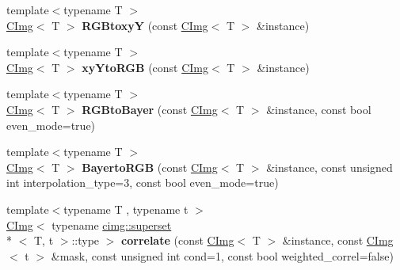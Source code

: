 \begin{DoxyCompactItemize}
\item 
\hypertarget{namespacecimg__library_a41902389cf0f939928cf8006540f9521}{{\footnotesize template$<$typename T $>$ }\\\hyperlink{structcimg__library_1_1_c_img}{C\-Img}$<$ T $>$ {\bfseries R\-G\-Btoxy\-Y} (const \hyperlink{structcimg__library_1_1_c_img}{C\-Img}$<$ T $>$ \&instance)}\label{namespacecimg__library_a41902389cf0f939928cf8006540f9521}

\item 
\hypertarget{namespacecimg__library_af124c838a51f3b7dbaf4dbe0506ac6bf}{{\footnotesize template$<$typename T $>$ }\\\hyperlink{structcimg__library_1_1_c_img}{C\-Img}$<$ T $>$ {\bfseries xy\-Yto\-R\-G\-B} (const \hyperlink{structcimg__library_1_1_c_img}{C\-Img}$<$ T $>$ \&instance)}\label{namespacecimg__library_af124c838a51f3b7dbaf4dbe0506ac6bf}

\item 
\hypertarget{namespacecimg__library_aa3811f949f1fbe0f699a7bc71f5440cb}{{\footnotesize template$<$typename T $>$ }\\\hyperlink{structcimg__library_1_1_c_img}{C\-Img}$<$ T $>$ {\bfseries R\-G\-Bto\-Bayer} (const \hyperlink{structcimg__library_1_1_c_img}{C\-Img}$<$ T $>$ \&instance, const bool even\-\_\-mode=true)}\label{namespacecimg__library_aa3811f949f1fbe0f699a7bc71f5440cb}

\item 
\hypertarget{namespacecimg__library_ac53b2de0d1464aa7dd7db6670aadbe04}{{\footnotesize template$<$typename T $>$ }\\\hyperlink{structcimg__library_1_1_c_img}{C\-Img}$<$ T $>$ {\bfseries Bayerto\-R\-G\-B} (const \hyperlink{structcimg__library_1_1_c_img}{C\-Img}$<$ T $>$ \&instance, const unsigned int interpolation\-\_\-type=3, const bool even\-\_\-mode=true)}\label{namespacecimg__library_ac53b2de0d1464aa7dd7db6670aadbe04}

\item 
\hypertarget{namespacecimg__library_a30f59a406769c0f5eeb473bdbfe862ff}{{\footnotesize template$<$typename T , typename t $>$ }\\\hyperlink{structcimg__library_1_1_c_img}{C\-Img}$<$ typename \hyperlink{structcimg__library_1_1cimg_1_1superset}{cimg\-::superset}\\*
$<$ T, t $>$\-::type $>$ {\bfseries correlate} (const \hyperlink{structcimg__library_1_1_c_img}{C\-Img}$<$ T $>$ \&instance, const \hyperlink{structcimg__library_1_1_c_img}{C\-Img}$<$ t $>$ \&mask, const unsigned int cond=1, const bool weighted\-\_\-correl=false)}\label{namespacecimg__library_a30f59a406769c0f5eeb473bdbfe862ff}


\end{DoxyCompactItemize}
